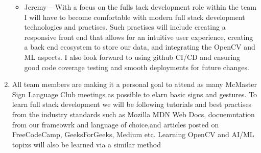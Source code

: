 \documentclass[12pt, titlepage]{article}
\begin{document}
\begin{enumerate}
\begin{itemize}
        \item Jeremy -- With a focus on the fulls tack development role within the team I will have to become comfortable with modern full stack development technologies and practises. Such practises will include creating a responsive front end that allows for an intuitive user experience, creating a back end ecosystem to store our data, and integrating the OpenCV and ML aspects. I also look forward to using github CI/CD and ensuring good code coverage testing and smooth deployments for future changes.
    \end{itemize}
    \item All team members are making it a personal goal to attend as many McMaster Sign Language Club meetings as possible to elarn basic signs and gestures.
    To learn full stack development we will be following tutorials and best practises from the industry standards such as Mozilla MDN Web Docs, docuemntation from our frameowrk and language of choice,and articles posted on FreeCodeCamp, GeeksForGeeks, Medium etc. Learning OpenCV and AI/ML topixs will also be learned via a similar method
    
\end{enumerate}
\end{document}
